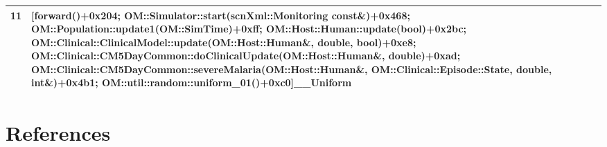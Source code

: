 \documentclass{article}
\begin{document}
\begin{table}[b!]
\begin{tabularx}{\textwidth}{@{}lX@{}}
11 & [forward()+0x204; OM::Simulator::start(scnXml::Monitoring const\&)+0x468; OM::Population::update1(OM::SimTime)+0xff; OM::Host::Human::update(bool)+0x2bc; OM::Clinical::ClinicalModel::update(OM::Host::Human\&, double, bool)+0xe8; OM::Clinical::CM5DayCommon::doClinicalUpdate(OM::Host::Human\&, double)+0xad; OM::Clinical::CM5DayCommon::severeMalaria(OM::Host::Human\&, OM::Clinical::Episode::State, double, int\&)+0x4b1; OM::util::random::uniform\_01()+0xc0]\_\_Uniform\\
\bottomrule                                                                                                                                   
\end{tabularx}
 \end{table}


\section*{References}



\end{document}
